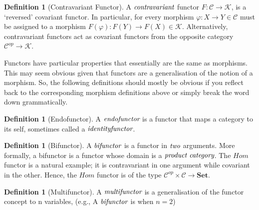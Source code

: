 \documentclass[10pt, oneside, reqno]{amsart}
\theoremstyle{plain}%
\theoremstyle{definition}
\newtheorem{defn}[thm]{Definition}
\theoremstyle{remark}
\begin{document}
\begin{defn}[Contravariant Functor]
 A $\emph{contravariant}$ functor $F: \mathcal{C} \to \mathcal{K}$, is a `reversed' covariant functor.
 In particular, for every morphism $\varphi: X \to Y \in \mathcal{C}$ must be assigned to a morphism $F(\varphi): F(Y) \to F(X) \in \mathcal{K}$.
 Alternatively, contravariant functors act as covariant functors from the opposite category $\mathcal{C}^{op} \to \mathcal{K}$.
\end{defn}

Functors have particular properties that essentially are the same as morphisms.
This may seem obvious given that functors are a generalisation of the notion of a morphism.
So, the following definitions should mostly be obvious if you reflect back to the corresponding morphism
definitions above or simply break the word down grammatically.

\begin{defn}[Endofunctor]
 A $\emph{endofunctor}$ is a functor that maps a category to its self, sometimes called a $\emph{identityfunctor}$.
\end{defn}

\begin{defn}[Bifunctor]
 A $\emph{bifunctor}$ is a functor in $\emph{two}$ arguments. More formally, a bifunctor is a functor whose
 domain is a $\emph{product category}$.
 The $Hom$ functor is a natural example; it is contravariant in one argument while covariant in the other.
 Hence, the $Hom$ functor is of the type $\mathcal{C}^{op} \times \mathcal{C} \to \textbf{Set}$.
\end{defn}

\begin{defn}[Multifunctor]
 A $\emph{multifunctor}$ is a generalisation of the functor concept to n variables, (e.g., A $\emph{bifunctor}$ is when $n=2$)
\end{defn}
\end{document}
